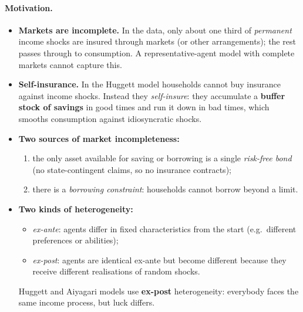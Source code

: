 \paragraph{Motivation.}
\begin{itemize}
  \item \textbf{Markets are incomplete.} In the data, only about one third of \emph{permanent} income shocks are insured through markets (or other arrangements); the rest passes through to consumption. A representative-agent model with complete markets cannot capture this.
  \item \textbf{Self-insurance.} In the Huggett model households cannot buy insurance against income shocks. Instead they \emph{self-insure}: they accumulate a \textbf{buffer stock of savings} in good times and run it down in bad times, which smooths consumption against idiosyncratic shocks.
  \item \textbf{Two sources of market incompleteness:}
    \begin{enumerate}
      \item the only asset available for saving or borrowing is a single \emph{risk-free bond} (no state-contingent claims, so no insurance contracts);
      \item there is a \emph{borrowing constraint}: households cannot borrow beyond a limit.
    \end{enumerate}
  \item \textbf{Two kinds of heterogeneity:}
    \begin{itemize}
      \item \emph{ex-ante}: agents differ in fixed characteristics from the start (e.g.\ different preferences or abilities);
      \item \emph{ex-post}: agents are identical ex-ante but become different because they receive different realisations of random shocks.
    \end{itemize}
    Huggett and Aiyagari models use \textbf{ex-post} heterogeneity: everybody faces the same income process, but luck differs.
\end{itemize}

